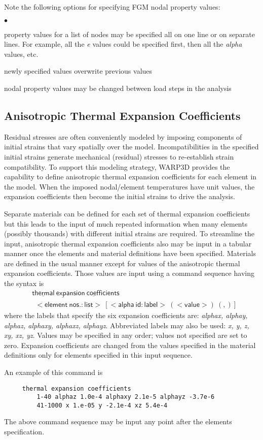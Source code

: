 \documentclass[11pt]{report}
\numberwithin{equation}{section}
\newcommand{\nin} {\noindent}
\newcommand{\ul} {\underline}
\newcommand{\hv} {\mathsf}   %
\newcommand{\ti}{\emph}
\newcommand{\squishlist}{
 \begin{list}{$\bullet$}
  { \setlength{\itemsep}{0pt}
     \setlength{\parsep}{3pt}
     \setlength{\topsep}{3pt}
     \setlength{\partopsep}{0pt}
     \setlength{\leftmargin}{1.5em}
     \setlength{\labelwidth}{1em}
     \setlength{\labelsep}{0.5em} } }
\newcommand{\squishend}{
  \end{list}  }
\begin{document}
\nin Note the following options for specifying FGM nodal property values:
\small
\squishlist
\item property values for a list of nodes may be specified all on one line or
on separate lines. For example, all the \ti{e} values could be specified first, then
all the \ti{alpha} values, etc.
\item newly specified values overwrite previous values
\item nodal property values may be changed between load steps in the analysis
\squishend
\normalsize

\subsection{Anisotropic Thermal Expansion Coefficients}
\nin
Residual stresses are often conveniently modeled by imposing components of
initial strains that vary spatially over the model. Incompatibilities in the
specified initial strains generate mechanical (residual) stresses to re-establish strain
compatibility. To support this modeling strategy, WARP3D provides the capability
to define anisotropic thermal expansion coefficients for each element in the
model. When the imposed nodal/element temperatures have unit values, the expansion
coefficients then become the initial strains to drive the analysis.

Separate materials can be defined for each set of thermal expansion coefficients
but this leads to the input of much repeated information when many elements
(possibly thousands) with different initial strains are required. To streamline
the input, anisotropic thermal expansion coefficients also may be input in a
tabular manner once the elements and material definitions have been specified.
Materials are defined in the usual manner except for values of the anisotropic
thermal expansion coefficients. Those values are input using a command sequence
having the syntax is
\begin{align*}
&\hv{\ul{thermal}\ \ul{expa}nsion\ \ul{coeff}icients} \\
&\hv{\ \ <element\ nos.:list>\ [<alpha\ id:label>\ (<value>)\ (,)]}
\end{align*}\normalsize
\nin where the labels that specify the six expansion coefficients are: \ti{alphax, alphay,
 alphaz, alphaxy, alphaxz, alphayz}. Abbreviated labels may also be used: \ti{x, y, z,
 xy, xz, yz}. Values may be specified in any order; values not specified are set
to zero. Expansion coefficients are changed from the values specified in the
material definitions only for elements specified in this input sequence.

\nin An example of this command is 
\small
\begin{verbatim}
     thermal expansion coefficients
         1-40 alphaz 1.0e-4 alphaxy 2.1e-5 alphayz -3.7e-6
         41-1000 x 1.e-05 y -2.1e-4 xz 5.4e-4
\end{verbatim}
\normalsize

\nin The above command sequence may be input any point after the elements
specification.
\end{document}
